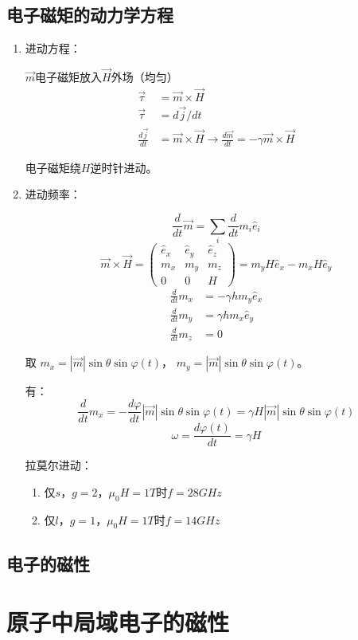 \subsection{电子磁矩的动力学方程}
\begin{enumerate}
    \item 进动方程：
    
    $\vec{m}$电子磁矩放入$\vec{H}$外场（均匀）
    \begin{align*}
        \vec{\tau} &= \vec{m} \times \vec{H}\\
        \vec{\tau} &= d\vec{j}/dt\\
        \frac{d\vec{j}}{dt} &= \vec{m} \times \vec{H}
        \to \frac{d\vec{m}}{dt} = -\gamma \vec{m} \times \vec{H}
    \end{align*}
    
    电子磁矩绕$H$逆时针进动。

    \item 进动频率：
    
    \[\frac{d}{dt}\vec{m} = \sum_{i}\frac{d}{dt}m_i\hat{e}_i\]
    \[\vec{m} \times \vec{H} = 
        \begin{pmatrix}
            \hat{e}_x&\hat{e}_y&\hat{e}_z\\
            m_x&m_y&m_z\\
            0&0&H
        \end{pmatrix}
        =m_yH\hat{e}_x-m_xH\hat{e}_y\]
    \begin{align*}
        \frac{d}{dt}m_x &= -\gamma h m_y \hat{e}_x\\
        \frac{d}{dt}m_y &= \gamma h m_x \hat{e}_y\\
        \frac{d}{dt}m_z &= 0
    \end{align*}

    取 $m_x=|\vec{m}|\sin\theta\sin\varphi(t)$，
       $m_y=|\vec{m}|\sin\theta\sin\varphi(t)$。

    有：
    \[ \frac{d}{dt}m_x = -\frac{d\varphi}{dt} 
       |\vec{m}|\sin\theta\sin\varphi(t)
       = \gamma H |\vec{m}|\sin\theta\sin\varphi(t)\]
    \[ \omega = \frac{d\varphi(t)}{dt} = \gamma H \]

    拉莫尔进动：
    \begin{enumerate}
        \item 仅$s$，$g=2$，$\mu_0H=1T$时$f=28GHz$
        \item 仅$l$，$g=1$，$\mu_0H=1T$时$f=14GHz$
    \end{enumerate}
\end{enumerate}


\subsection{电子的磁性}



\section{原子中局域电子的磁性}